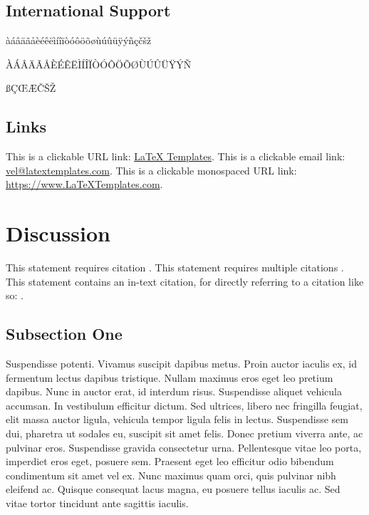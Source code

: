 \documentclass[a4paper]{LTJournalArticle}
\begin{document}
	\subsection{International Support}
	
	\noindent àáâäãåèéêëìíîïòóôöõøùúûüÿýñçčšž
	
	\noindent ÀÁÂÄÃÅÈÉÊËÌÍÎÏÒÓÔÖÕØÙÚÛÜŸÝÑ
	
	\noindent ßÇŒÆČŠŽ
	
	\subsection{Links}
	
	This is a clickable URL link: \href{https://www.latextemplates.com}{LaTeX Templates}. This is a clickable email link: \href{mailto:vel@latextemplates.com}{vel@latextemplates.com}. This is a clickable monospaced URL link: \url{https://www.LaTeXTemplates.com}.
	
	
	\section{Discussion}
	
	This statement requires citation \autocite{Smith:2023qr}. This statement requires multiple citations \autocite{Smith:2023qr, Smith:2024jd}. This statement contains an in-text citation, for directly referring to a citation like so: \textcite{Smith:2024jd}.
	
	\subsection{Subsection One}
	
	Suspendisse potenti. Vivamus suscipit dapibus metus. Proin auctor iaculis ex, id fermentum lectus dapibus tristique. Nullam maximus eros eget leo pretium dapibus. Nunc in auctor erat, id interdum risus. Suspendisse aliquet vehicula accumsan. In vestibulum efficitur dictum. Sed ultrices, libero nec fringilla feugiat, elit massa auctor ligula, vehicula tempor ligula felis in lectus. Suspendisse sem dui, pharetra ut sodales eu, suscipit sit amet felis. Donec pretium viverra ante, ac pulvinar eros. Suspendisse gravida consectetur urna. Pellentesque vitae leo porta, imperdiet eros eget, posuere sem. Praesent eget leo efficitur odio bibendum condimentum sit amet vel ex. Nunc maximus quam orci, quis pulvinar nibh eleifend ac. Quisque consequat lacus magna, eu posuere tellus iaculis ac. Sed vitae tortor tincidunt ante sagittis iaculis.
	
\end{document}
